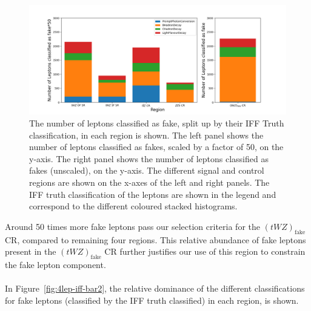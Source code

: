 \begin{figure}[htbp]
\centering

    \includegraphics[width=.8\textwidth]{figures/iff_bar_1.png}   

    \caption{The number of leptons classified as fake, split up by their IFF Truth classification, in each region is shown. The left panel shows the number of leptons classified as fakes, scaled by a factor of 50, on the y-axis. The right panel shows the number of leptons classified as fakes (unscaled), on the y-axis. The different signal and control regions are shown on the x-axes of the left and right panels. The IFF truth classification of the leptons are shown in the legend and correspond to the different coloured stacked histograms.}
  \label{fig:4lep-iff-bar1}
\end{figure}

Around 50 times more fake leptons pass our selection criteria for the $(tWZ)_{\text{fake}}$ CR, compared to remaining four regions. This relative abundance of fake leptons present in the $(tWZ)_{\text{fake}}$ CR further justifies our use of this region to constrain the fake lepton component.\\\\

In Figure~\ref{fig:4lep-iff-bar2}, the relative dominance of the different classifications for fake leptons (classified by the IFF truth classified) in each region, is shown.

